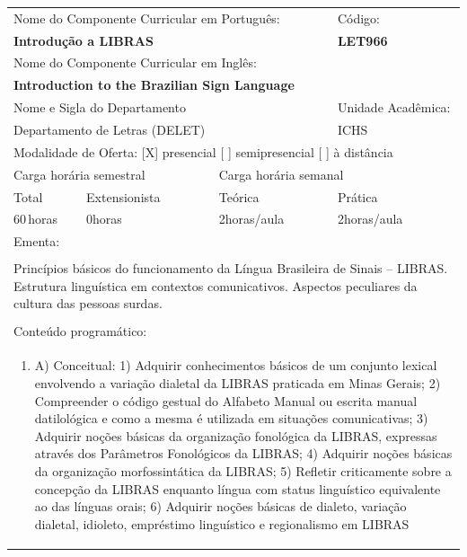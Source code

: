 \documentclass[11pt]{article}
\begin{document}
\begin{center}
\begin{longtable}{|p{4cm}|p{4cm}|p{4cm}|p{4cm}|}
\hline
\multicolumn{3}{|p{12cm}|}{Nome do Componente Curricular em Português:} &
\multicolumn{1}{p{4cm}|}{Código:} \\ 
\multicolumn{3}{|p{12cm}|}{\textbf{Introdução a LIBRAS}} &
\textbf{LET966}\\ 
\multicolumn{3}{|p{12cm}|}{Nome do Componente Curricular em Inglês:} & \\ 
\multicolumn{3}{|p{12cm}|}{\textbf{Introduction to the Brazilian Sign Language}} & \\ 
\hline
\multicolumn{3}{|p{12cm}|}{Nome e Sigla do Departamento} & Unidade Acadêmica: \\ 
\multicolumn{3}{|p{12cm}|}{Departamento de Letras (DELET)} & {ICHS} \\ 
\hline
\multicolumn{4}{|p{16cm}|}{Modalidade de Oferta:
[X] presencial \hspace{0.6cm}
[ ] semipresencial \hspace{0.6cm}
[ ] à distância}\\
\hline
\multicolumn{2}{|p{8cm}|}{Carga horária semestral} &
\multicolumn{2}{p{8cm}|}{Carga horária semanal}\\
\hline
\multicolumn{1}{|p{4cm}|}{Total} &
\multicolumn{1}{p{4cm}|}{Extensionista} &
\multicolumn{1}{p{4cm}|}{Teórica} &
\multicolumn{1}{p{4cm}|}{Prática} \\ 
\multicolumn{1}{|p{4cm}|}{60\,horas} &
\multicolumn{1}{p{4cm}|}{0\;horas} &
\multicolumn{1}{p{4cm}|}{2\;horas/aula} &
\multicolumn{1}{p{4cm}|}{2\;horas/aula} \\ 
\hline
\multicolumn{4}{|p{16cm}|}{Ementa:}\\
\multicolumn{4}{|p{16cm}|}{}\\
\multicolumn{4}{|p{\dimexpr 16cm + 6\tabcolsep\relax}|}{Princípios básicos do funcionamento da Língua Brasileira de Sinais – LIBRAS. Estrutura linguística em contextos comunicativos. Aspectos peculiares da cultura das pessoas surdas.}\\
\multicolumn{4}{|p{16cm}|}{}\\
\hline
\multicolumn{4}{|p{16cm}|}{Conteúdo programático:}\\*
\multicolumn{4}{|p{\dimexpr 16cm + 6\tabcolsep\relax}|}{\begin{enumerate}[start=1]\item A) Conceitual: 1) Adquirir conhecimentos básicos de um conjunto lexical envolvendo a variação dialetal da LIBRAS praticada em Minas Gerais; 2) Compreender o código gestual do Alfabeto Manual ou escrita manual datilológica e como a mesma é utilizada em situações comunicativas; 3) Adquirir noções básicas da organização fonológica da LIBRAS, expressas através dos Parâmetros Fonológicos da LIBRAS; 4) Adquirir noções básicas da organização morfossintática da LIBRAS; 5) Refletir criticamente sobre a concepção da LIBRAS enquanto língua com status linguístico equivalente ao das línguas orais; 6) Adquirir noções básicas de dialeto, variação dialetal, idioleto, empréstimo linguístico e regionalismo em LIBRAS\end{enumerate}}\\

\end{longtable}
\end{center}
\end{document}
